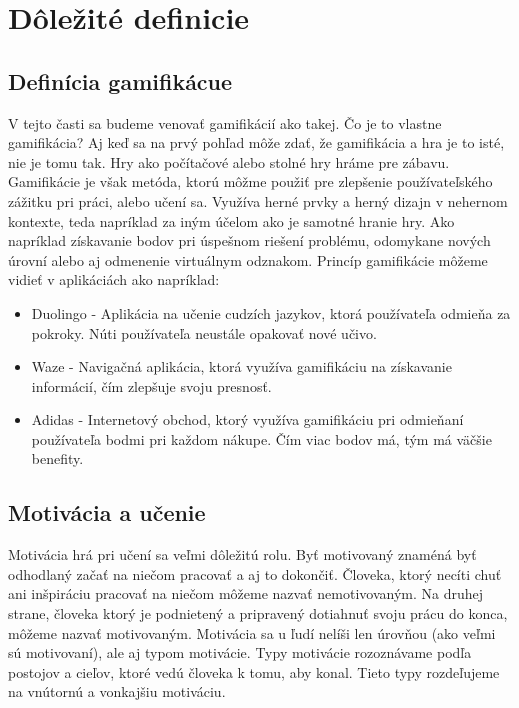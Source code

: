 \documentclass[10pt,oneside,slovak,a4paper]{article}
\begin{document}
\section{Dôležité definicie} \label{definicie}
\subsection{Definícia gamifikácue} \label{gamifikacia}
V tejto časti sa budeme venovať gamifikácií ako takej. Čo je to vlastne gamifikácia? Aj keď sa na prvý pohľad môže zdať, že gamifikácia a hra je to isté, nie je tomu tak. Hry ako počítačové alebo stolné hry hráme pre zábavu. Gamifikácie je však metóda, ktorú môžme použiť pre zlepšenie používateľského zážitku pri práci, alebo učení sa. Využíva herné prvky a herný dizajn v nehernom kontexte, teda napríklad za iným účelom ako je samotné hranie hry. Ako napríklad získavanie bodov pri úspešnom riešení problému, odomykane nových úrovní alebo aj odmenenie virtuálnym odznakom. Princíp gamifikácie môžeme vidieť v aplikáciách ako napríklad:

\begin{itemize}
    \item Duolingo - Aplikácia na učenie cudzích jazykov, ktorá používateľa odmieňa za pokroky. Núti používateľa neustále opakovať nové učivo.
    \item Waze - Navigačná aplikácia, ktorá využíva gamifikáciu na získavanie informácií, čím zlepšuje svoju presnosť.
    \item Adidas - Internetový obchod, ktorý využíva gamifikáciu pri odmieňaní používateľa bodmi pri každom nákupe. Čím viac bodov má, tým má väčšie benefity.
\end{itemize}



\subsection{Motivácia a učenie} \label{motivacia}
Motivácia hrá pri učení sa veľmi dôležitú rolu. Byť motivovaný znaméná byť odhodlaný začať na niečom pracovať a aj to dokončiť. Človeka, ktorý necíti chuť ani inšpiráciu pracovať na niečom môžeme nazvať nemotivovaným. Na druhej strane, človeka ktorý je podnietený a pripravený dotiahnuť svoju prácu do konca, môžeme nazvať motivovaným. Motivácia sa u ľudí nelíši len úrovňou (ako veľmi sú motivovaní), ale aj typom motivácie. Typy motivácie rozoznávame podľa postojov a cieľov, ktoré vedú človeka k tomu, aby konal. Tieto typy rozdeľujeme na vnútornú a vonkajšiu motiváciu. ~\cite{ryan2000intrinsic}
\end{document}

